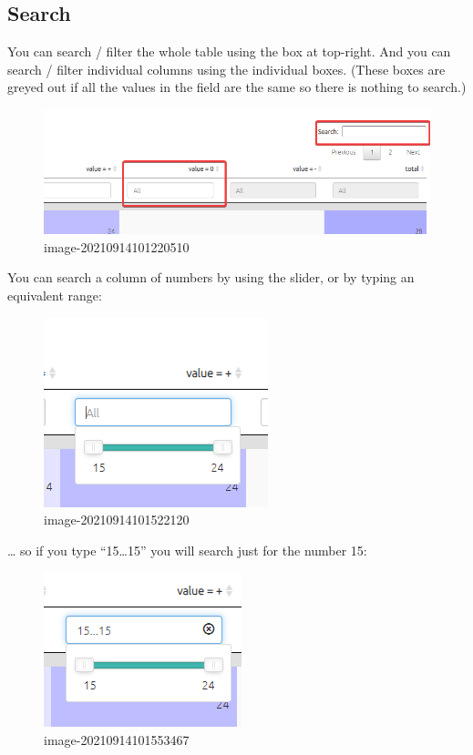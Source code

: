 \documentclass[
]{book}
\begin{document}
\hypertarget{search}{%
\subsection{Search}\label{search}}

You can search / filter the whole table using the box at top-right. And you can search / filter individual columns using the individual boxes. (These boxes are greyed out if all the values in the field are the same so there is nothing to search.)

\begin{figure}
\centering
\includegraphics{_assets/image-20210914101220510.png}
\caption{image-20210914101220510}
\end{figure}

You can search a column of numbers by using the slider, or by typing an equivalent range:

\begin{figure}
\centering
\includegraphics{_assets/image-20210914101522120.png}
\caption{image-20210914101522120}
\end{figure}

\ldots{} so if you type ``15\ldots15'' you will search just for the number 15:

\begin{figure}
\centering
\includegraphics{_assets/image-20210914101553467.png}
\caption{image-20210914101553467}
\end{figure}
\end{document}
